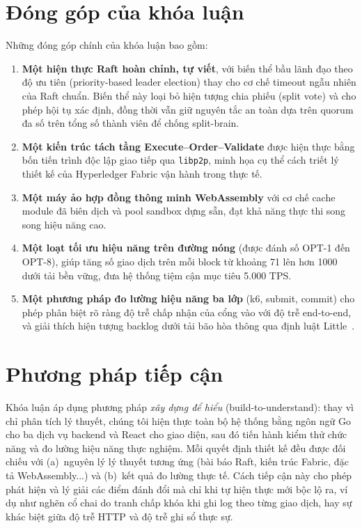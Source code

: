 \section{Đóng góp của khóa luận}
\label{sec:contributions}

Những đóng góp chính của khóa luận bao gồm:

\begin{enumerate}
  \item \textbf{Một hiện thực Raft hoàn chỉnh, tự viết}, với biến thể bầu lãnh
  đạo theo độ ưu tiên (priority-based leader election) thay cho cơ chế timeout
  ngẫu nhiên của Raft chuẩn. Biến thể này loại bỏ hiện tượng chia phiếu (split
  vote) và cho phép hội tụ xác định, đồng thời vẫn giữ nguyên tắc an toàn dựa
  trên quorum đa số trên tổng số thành viên để chống split-brain.

  \item \textbf{Một kiến trúc tách tầng Execute--Order--Validate} được hiện thực
  bằng bốn tiến trình độc lập giao tiếp qua \texttt{libp2p}, minh họa cụ thể
  cách triết lý thiết kế của Hyperledger Fabric vận hành trong thực tế.

  \item \textbf{Một máy ảo hợp đồng thông minh WebAssembly} với cơ chế cache
  module đã biên dịch và pool sandbox dựng sẵn, đạt khả năng thực thi song song
  hiệu năng cao.

  \item \textbf{Một loạt tối ưu hiệu năng trên đường nóng} (được đánh số
  OPT-1 đến OPT-8), giúp tăng số giao dịch trên mỗi block từ khoảng 71 lên hơn
  1000 dưới tải bền vững, đưa hệ thống tiệm cận mục tiêu 5.000 TPS.

  \item \textbf{Một phương pháp đo lường hiệu năng ba lớp} (k6, submit, commit)
  cho phép phân biệt rõ ràng độ trễ chấp nhận của cổng vào với độ trễ
  end-to-end, và giải thích hiện tượng backlog dưới tải bão hòa thông qua định
  luật Little~\cite{little1961law}.
\end{enumerate}

\section{Phương pháp tiếp cận}
\label{sec:approach}

Khóa luận áp dụng phương pháp \textit{xây dựng để hiểu} (build-to-understand):
thay vì chỉ phân tích lý thuyết, chúng tôi hiện thực toàn bộ hệ thống bằng ngôn
ngữ Go cho ba dịch vụ backend và React cho giao diện, sau đó tiến hành kiểm thử
chức năng và đo lường hiệu năng thực nghiệm. Mỗi quyết định thiết kế đều được
đối chiếu với (a)~nguyên lý lý thuyết tương ứng (bài báo Raft, kiến trúc Fabric,
đặc tả WebAssembly...) và (b)~kết quả đo lường thực tế. Cách tiếp cận này cho
phép phát hiện và lý giải các điểm đánh đổi mà chỉ khi tự hiện thực mới bộc lộ
ra, ví dụ như nghẽn cổ chai do tranh chấp khóa khi ghi log theo từng giao dịch,
hay sự khác biệt giữa độ trễ HTTP và độ trễ ghi sổ thực sự.

